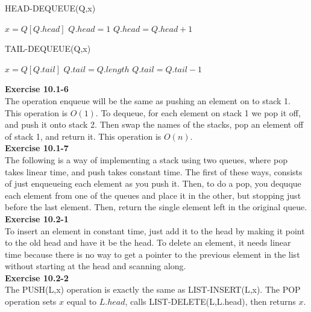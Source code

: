 \documentclass{article}
\begin{document}
\begin{algorithm}
\caption{HEAD-DEQUEUE(Q,x)}
\begin{algorithmic}
\State $x = Q[Q.head] $
\State $Q.head = 1$
\Else
\State $Q.head = Q.head+1$
\EndIf
\end{algorithmic}
\end{algorithm}

\begin{algorithm}
\caption{TAIL-DEQUEUE(Q,x)}
\begin{algorithmic}
\State $x = Q[Q.tail]$
\State $Q.tail = Q.length$
\Else
\State $Q.tail = Q.tail-1$
\EndIf
\end{algorithmic}
\end{algorithm}

\noindent\textbf{Exercise 10.1-6}\\

The operation enqueue will be the same as pushing an element on to stack 1.  This operation is $O(1)$. To dequeue, for each element on stack 1 we pop it off, and push it onto stack 2.  Then swap the names of the stacks, pop an element off of stack 1, and return it. This operation is $O(n)$. \\

\noindent\textbf{ Exercise 10.1-7} \\

The following is a way of implementing a stack using two queues, where pop takes linear time, and push takes constant time. The first of these ways, consists of just enqueueing each element as you push it. Then, to do a pop, you dequque each element from one of the queues and place it in the other, but stopping just before the last element. Then, return the single element left in the original queue.\\



\noindent\textbf{ Exercise 10.2-1} \\

To insert an element in constant time, just add it to the head by making it point to the old head and have it be the head. To delete an element, it needs linear time because there is no way to get a pointer to the previous element in the list without starting at the head and scanning along.\\

\noindent\textbf{Exercise 10.2-2}\\

The PUSH(L,x) operation is exactly the same as LIST-INSERT(L,x).  The POP operation sets $x$ equal to $L.head$, calls LIST-DELETE(L,L.head), then returns $x$. \\
\end{document}
